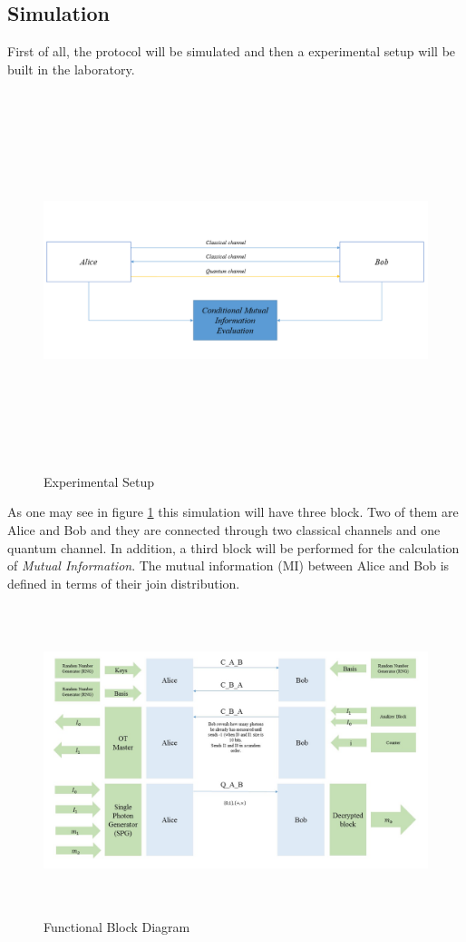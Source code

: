 \subsection{Simulation}

First of all, the protocol will be simulated and then a experimental setup will be built in the laboratory.

\begin{figure}[H]
	\centering
	\includegraphics[width=1.0\textwidth, height=11cm]{./sdf/ot_with_discrete_variables/figures/SetupOt.png}
	\caption{Experimental Setup}\label{experimentalsetup}
\end{figure}

As one may see in figure \ref{experimentalsetup} this simulation will have three block. Two of them are Alice and Bob and they are connected through two classical channels and one quantum channel. In addition, a third block will be performed for the calculation of \textit{Mutual Information}. The mutual information (MI) between Alice and Bob is defined in terms of their join distribution.

\begin{figure}[h]
	\centering \includegraphics[width=1.1\textwidth,height=9cm]{./sdf/ot_with_discrete_variables/figures/DiagramBlock_Simulation.jpg}
	\caption{Functional Block Diagram}\label{functionalblockdiagram}
\end{figure}

